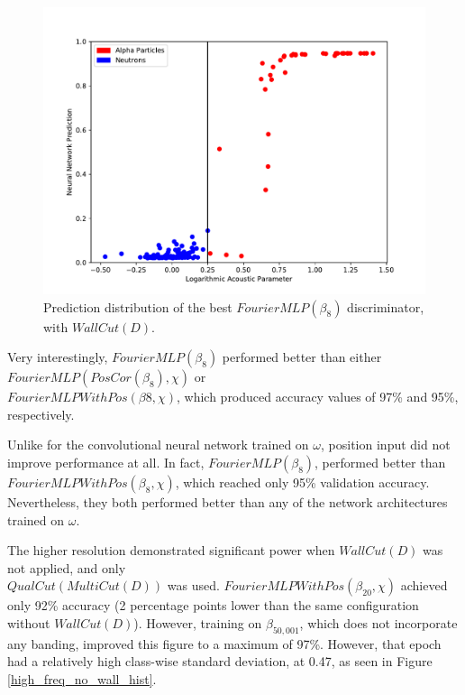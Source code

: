 \documentclass[10pt]{article}
\begin{document}
\begin{figure}[H]
    \centering
    \includegraphics[width=\textwidth]{banded_no_pos_input_hist}
    \caption{\label{banded_no_pos_input_hist} Prediction distribution of the best $FourierMLP(\beta_{8})$ discriminator, with $WallCut(D)$.}
\end{figure}

Very interestingly, $FourierMLP(\beta_{8})$ performed better than either $FourierMLP(PosCor(\beta_{8}), \chi)$ or \\ $FourierMLPWithPos(\beta{8}, \chi)$, which produced accuracy values of 97\% and 95\%, respectively.

Unlike for the convolutional neural network trained on $\omega$, position input did not improve performance at all. In fact, $FourierMLP(\beta_{8})$, performed better than $FourierMLPWithPos(\beta_{8}, \chi)$, which reached only 95\% validation accuracy. Nevertheless, they both performed better than any of the network architectures trained on $\omega$.

The higher resolution demonstrated significant power when $WallCut(D)$ was not applied, and only \\ $QualCut(MultiCut(D))$ was used. $FourierMLPWithPos(\beta_{20}, \chi)$ achieved only 92\% accuracy (2 percentage points lower than the same configuration without $WallCut(D)$). However, training on $\beta_{50,001}$, which does not incorporate any banding, improved this figure to a maximum of 97\%. However, that epoch had a relatively high class-wise standard deviation, at 0.47, as seen in Figure \ref{high_freq_no_wall_hist}.
\end{document}

